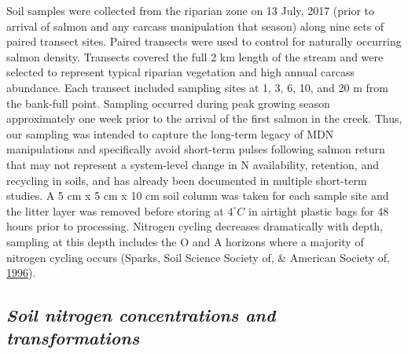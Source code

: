 \documentclass [11pt, proquest] {uwthesis}[2015/03/03]
\begin{document}
Soil samples were collected from the riparian zone on 13 July, 2017
(prior to arrival of salmon and any carcass manipulation that season)
along nine sets of paired transect sites. Paired transects were used to
control for naturally occurring salmon density. Transects covered the
full 2 km length of the stream and were selected to represent typical
riparian vegetation and high annual carcass abundance. Each transect
included sampling sites at 1, 3, 6, 10, and 20 m from the bank-full
point. Sampling occurred during peak growing season approximately one
week prior to the arrival of the first salmon in the creek. Thus, our
sampling was intended to capture the long-term legacy of MDN
manipulations and specifically avoid short-term pulses following salmon
return that may not represent a system-level change in N availability,
retention, and recycling in soils, and has already been documented in
multiple short-term studies. A 5 cm x 5 cm x 10 cm soil column was taken
for each sample site and the litter layer was removed before storing at
\(4^{\circ}C\) in airtight plastic bags for 48 hours prior to
processing. Nitrogen cycling decreases dramatically with depth, sampling
at this depth includes the O and A horizons where a majority of nitrogen
cycling occurs (Sparks, Soil Science Society of, \& American Society of,
\protect\hyperlink{ref-Sparks1996}{1996}).

\subsection{\texorpdfstring{\emph{Soil nitrogen concentrations and
transformations}}{Soil nitrogen concentrations and transformations}}\label{soil-nitrogen-concentrations-and-transformations}
\end{document}
